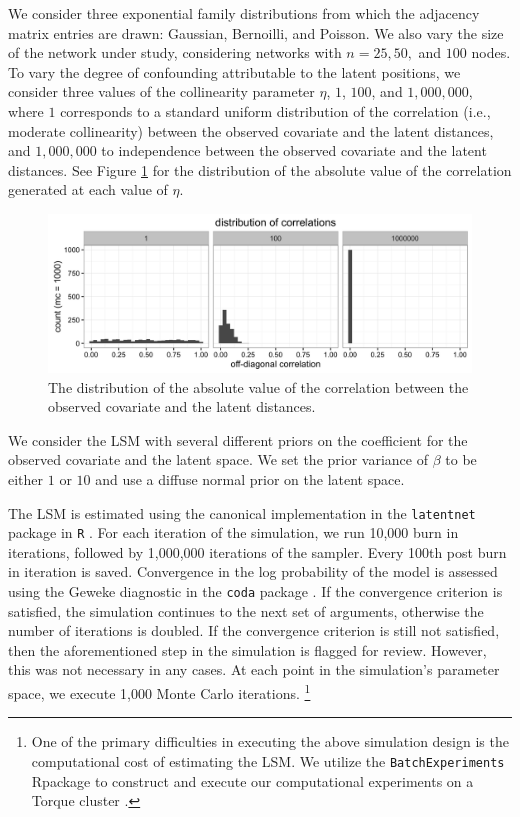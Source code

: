 \documentclass[11pt]{article}
\newcommand{\R}{\textsf{R}\space} %
\begin{document}
We consider three exponential family distributions from which the
adjacency matrix entries are drawn: Gaussian, Bernoilli, and
Poisson. We also vary the size of the network under study, considering
networks with $n = 25, 50,$ and $100$ nodes. To vary the degree of
confounding attributable to the latent positions, we consider three
values of the collinearity parameter $\eta$, $1$, $100$, and
$1,000,000$, where $1$ corresponds to a standard uniform distribution
of the correlation (i.e., moderate collinearity) between the observed
covariate and the latent distances, and $1,000,000$ to independence
between the observed covariate and the latent distances. See Figure
\ref{fig:vine} for the distribution of the absolute value of the
correlation generated at each value of $\eta$.

\begin{figure}
\includegraphics[width=\textwidth]{figures/max_r_vine.png}
\caption{The distribution of the absolute value of the correlation between the observed covariate and the latent distances. \label{fig:vine}}
\end{figure}

We consider the LSM with several different priors on the coefficient
for the observed covariate and the latent space. We set the prior
variance of $\beta$ to be either $1$ or $10$ and use a diffuse normal
prior on the latent space.

The LSM is estimated using the canonical implementation in the
\texttt{latentnet} package in \texttt{R} \citep{latentnet}. For each
iteration of the simulation, we run 10,000 burn in iterations,
followed by 1,000,000 iterations of the sampler. Every 100th post burn
in iteration is saved. Convergence in the log probability of the model
is assessed using the Geweke diagnostic in the \texttt{coda} package
\citep{coda, geweke1991evaluating}. If the convergence criterion is
satisfied, the simulation continues to the next set of arguments,
otherwise the number of iterations is doubled. If the convergence
criterion is still not satisfied, then the aforementioned step in the
simulation is flagged for review. However, this was not necessary in
any cases. At each point in the simulation's parameter space, we
execute 1,000 Monte Carlo iterations. \footnote{One of the primary
  difficulties in executing the above simulation design is the
  computational cost of estimating the LSM. We utilize the
  \texttt{BatchExperiments} \R package to construct and execute our
  computational experiments on a Torque cluster
  \cite{bischl2015batchjobs}.}
\end{document}
